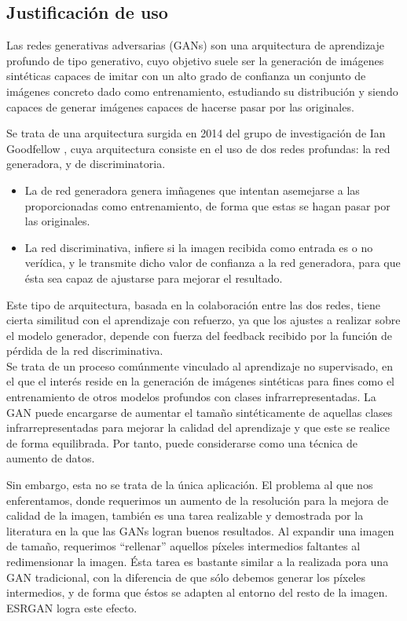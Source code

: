 \subsection{Justificación de uso}

Las redes generativas adversarias (GANs)  \cite{goodfellow2014generative} son una arquitectura de aprendizaje profundo de tipo generativo, cuyo objetivo suele ser la generación de imágenes sintéticas capaces de imitar con un alto grado de confianza un conjunto de imágenes concreto dado como entrenamiento, estudiando su distribución y siendo capaces de generar imágenes capaces de hacerse pasar por las originales.

Se trata de una arquitectura surgida en 2014 del grupo de investigación de Ian Goodfellow \cite{goodfellow2014generative}, cuya arquitectura consiste en el uso de dos redes profundas: la red generadora, y de discriminatoria.

 \begin{itemize}
 	\item La de red generadora genera imñagenes que intentan asemejarse a las proporcionadas como entrenamiento, de forma que estas se hagan pasar por las originales.
 	\item La red discriminativa, infiere si la imagen recibida como entrada es o no verídica, y le transmite dicho valor de confianza a la red generadora, para que ésta sea capaz de ajustarse para mejorar el resultado.
 	\end{itemize}
 	
 Este tipo de arquitectura, basada en la colaboración entre las dos redes, tiene cierta similitud con el aprendizaje con refuerzo, ya que los ajustes a realizar sobre el modelo generador, depende con fuerza del feedback recibido por la función de pérdida de la red discriminativa.\\
 
 Se trata de un proceso comúnmente vinculado al aprendizaje no supervisado, en el que el interés reside en la generación de imágenes sintéticas para fines como el entrenamiento de otros modelos profundos con clases infrarrepresentadas. La GAN puede encargarse de aumentar el tamaño sintéticamente de aquellas clases infrarrepresentadas para mejorar la calidad del aprendizaje y que este se realice de forma equilibrada. Por tanto, puede considerarse como una técnica de aumento de datos.

Sin embargo, esta no se trata de la única aplicación. El problema al que nos enferentamos, donde requerimos un aumento de la resolución para la mejora de calidad de la imagen, también es una tarea realizable y demostrada por la literatura en la que las GANs logran buenos resultados. Al expandir una imagen de tamaño, requerimos ``rellenar'' aquellos píxeles intermedios faltantes al redimensionar la imagen. Ésta tarea es bastante similar a la realizada pora una GAN tradicional, con la diferencia de que sólo debemos generar los píxeles intermedios, y de forma que éstos se adapten al entorno del resto de la imagen.  ESRGAN\cite{wang2018esrgan} logra este efecto.\\

